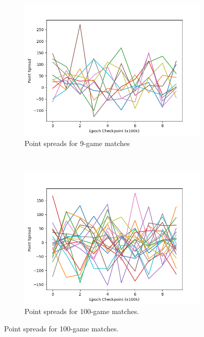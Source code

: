
\begin{figure}
\center
\begin{subfigure}[b]{0.45\textwidth}
	\center
	\includegraphics[width=\textwidth]{images/discussion/usefulness/r2-time-series-9.png}
	\caption{Point spreads for 9-game matches} %
	\label{fig:r2-time-series-9}
\end{subfigure}
~
\begin{subfigure}[b]{0.45\textwidth}
	\center
	\includegraphics[width=\textwidth]{images/discussion/usefulness/r2-time-series-100.png}
	\caption{Point spreads for 100-game matches.}
	\label{fig:r2-time-series-100}
\end{subfigure}


\end{figure}
